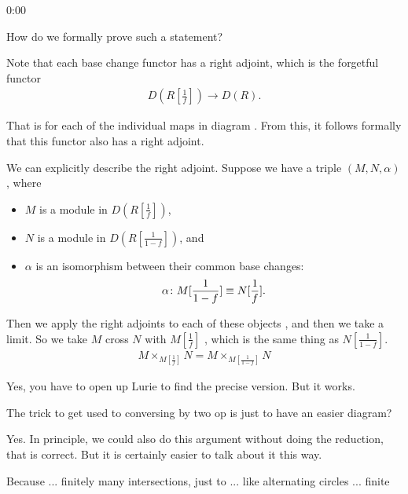\begin{unfinished}{0:00}
\begin{question}
How do we formally prove such a statement?
\end{question}

\begin{sketch}
Note that each base change functor has a right adjoint, which is the forgetful functor
\begin{align*}
D(R[\frac{1}{f}]) \to D(R).
\end{align*}

That is for each of the individual maps in diagram .
From this, it follows formally that this  functor also has a right adjoint.

We can explicitly describe the right adjoint. Suppose we have a triple $(M, N, \alpha)$, where 
\begin{itemize}
	\item $M$ is a module in $D(R[\frac{1}{f}])$,
	\item $N$ is a module in $D(R[\frac{1}{1-f}])$, and
	\item  $\alpha$ is an isomorphism between their common base changes:
	\begin{align*}
	\alpha \colon M[\frac{1}{1-f}] \equiv N[\frac{1}{f}].
	\end{align*}
\end{itemize}

Then we apply the right adjoints to each of these objects , and then we take a limit. 
So we take $M$ cross $N$ with $M[\frac{1}{f}]$ , which is the same thing as $N[\frac{1}{1-f}]$.
\begin{align*}
M \times_{M[\frac{1}{f}]} N = M \times_{M[\frac{1}{1-f}]} N
\end{align*}

\end{sketch}

\ques {}

\ans Yes, you have to open up Lurie to find the precise version. But it works.

\ques The trick to get used to conversing by two op is just to have an easier diagram?

\ans Yes. In principle, we could also do this argument without doing the reduction, that is correct. But it is certainly easier to talk about it this way.

\gabber Because ... finitely many intersections, just to ... like alternating circles ... finite 


\end{unfinished}
